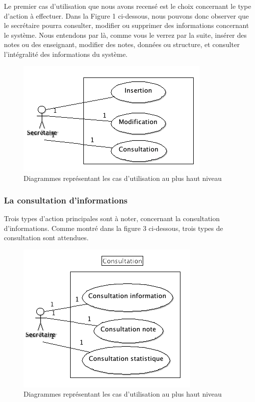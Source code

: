 \documentclass[letter, 11pt] {article}
\begin{document}
	
	Le premier cas d'utilisation que nous avons recensé est le choix concernant le type d'action à effectuer. Dans la Figure 1 ci-dessous, nous pouvons donc observer que le secrétaire pourra consulter, modifier ou supprimer des informations concernant le système. Nous entendons par là, comme vous le verrez par la suite, insérer des notes ou des enseignant, modifier des notes, données ou structure, et consulter l'intégralité des informations du système.
	
		\begin{figure}[!h]
			\centering
				\includegraphics[scale = 0.7]{../UseCase/UseCaseHautNiveau/UseCase_HautNiveau_General.png}
			\caption{Diagrammes représentant les cas d'utilisation au plus haut niveau}
		\end{figure}
		
		
	\subsubsection{La consultation d'informations}
	
	Trois types d'action principales sont à noter, concernant la consultation d'informations. Comme montré dans la figure 3 ci-dessous, trois types de consultation sont attendues.
			
	\begin{figure}[!h]
		\centering
			\includegraphics[scale = 0.7]{../UseCase/UseCaseHautNiveau/Consultation.png}
		\caption{Diagrammes représentant les cas d'utilisation au plus haut niveau}
	\end{figure}
	
\end{document}
